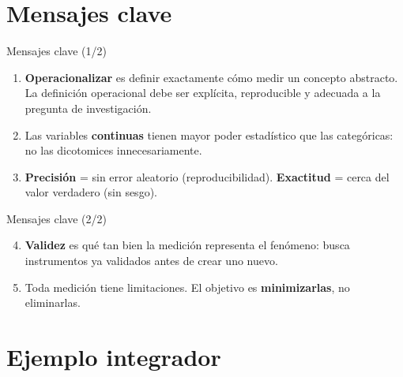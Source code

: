 \documentclass[aspectratio=169, 12pt, xcolor=table]{beamer}
\begin{document}
\section{Mensajes clave}


\begin{frame}{Mensajes clave (1/2)}
  \begin{clave}
    \begin{enumerate}
      \item \textbf{Operacionalizar} es definir exactamente cómo medir
            un concepto abstracto. La definición operacional debe ser
            explícita, reproducible y adecuada a la pregunta de investigación.
      \item Las variables \textbf{continuas} tienen mayor poder estadístico
            que las categóricas: no las dicotomices innecesariamente.
      \item \textbf{Precisión} = sin error aleatorio (reproducibilidad).
            \textbf{Exactitud} = cerca del valor verdadero (sin sesgo).
    \end{enumerate}
  \end{clave}
\end{frame}

\begin{frame}{Mensajes clave (2/2)}
  \begin{clave}
    \begin{enumerate}
      \setcounter{enumi}{3}
      \item \textbf{Validez} es qué tan bien la medición representa
            el fenómeno: busca instrumentos ya validados antes de crear uno nuevo.
      \item Toda medición tiene limitaciones. El objetivo es
            \textbf{minimizarlas}, no eliminarlas.
    \end{enumerate}
  \end{clave}
\end{frame}

\section{Ejemplo integrador}
\end{document}

